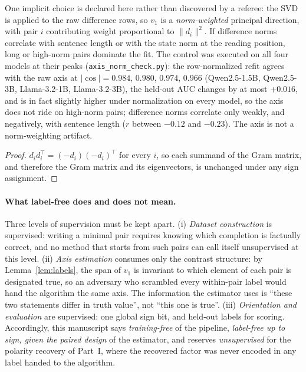 \documentclass[11pt]{article}
\begin{document}
One implicit choice is declared here rather than discovered by a referee:
the SVD is applied to the raw difference rows, so $v_1$ is a
\emph{norm-weighted} principal direction, with pair $i$ contributing
weight proportional to $\lVert d_i \rVert^{2}$. If difference norms
correlate with sentence length or with the state norm at the reading
position, long or high-norm pairs dominate the fit. The control was
executed on all four models at their peaks
(\texttt{axis\_norm\_check.py}): the row-normalized refit agrees with the
raw axis at $|\cos| = 0.984$, $0.980$, $0.974$, $0.966$ (Qwen2.5-1.5B,
Qwen2.5-3B, Llama-3.2-1B, Llama-3.2-3B), the held-out AUC changes by at
most $+0.016$, and is in fact slightly higher under normalization on every
model, so the axis does not ride on high-norm pairs; difference norms
correlate only weakly, and negatively, with sentence length ($r$ between
$-0.12$ and $-0.23$). The axis is not a norm-weighting artifact.


\begin{proof}
$d_i d_i^{\top} = (-d_i)(-d_i)^{\top}$ for every $i$, so each summand of the
Gram matrix, and therefore the Gram matrix and its eigenvectors, is unchanged
under any sign assignment.
\end{proof}

\paragraph{What label-free does and does not mean.} Three levels of
supervision must be kept apart. (i) \emph{Dataset construction} is
supervised: writing a minimal pair requires knowing which completion is
factually correct, and no method that starts from such pairs can call
itself unsupervised at this level. (ii) \emph{Axis estimation} consumes
only the contrast structure: by Lemma~\ref{lem:labels}, the span of $v_1$
is invariant to which element of each pair is designated true, so an
adversary who scrambled every within-pair label would hand the algorithm
the same axis. The information the estimator uses is ``these two
statements differ in truth value'', not ``this one is true''.
(iii) \emph{Orientation and evaluation} are supervised: one global sign
bit, and held-out labels for scoring. Accordingly, this manuscript says
\emph{training-free} of the pipeline, \emph{label-free up to sign, given
the paired design} of the estimator, and reserves \emph{unsupervised} for
the polarity recovery of Part~I, where the recovered factor was never
encoded in any label handed to the algorithm.
\end{document}
